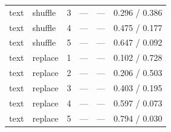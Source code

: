 \begin{table}[h]
\begin{tabular}{llcccc}
text & shuffle & 3 & --- & --- & 0.296 / 0.386 \\
text & shuffle & 4 & --- & --- & 0.475 / 0.177 \\
text & shuffle & 5 & --- & --- & 0.647 / 0.092 \\
text & replace & 1 & --- & --- & 0.102 / 0.728 \\
text & replace & 2 & --- & --- & 0.206 / 0.503 \\
text & replace & 3 & --- & --- & 0.403 / 0.195 \\
text & replace & 4 & --- & --- & 0.597 / 0.073 \\
text & replace & 5 & --- & --- & 0.794 / 0.030 \\
\bottomrule
\end{tabular}
\end{table}